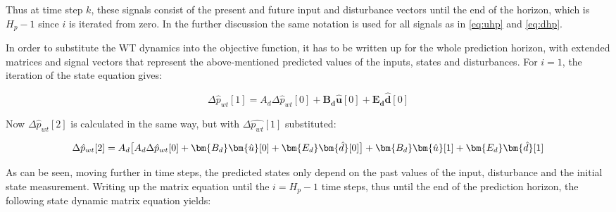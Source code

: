 Thus at time step $k$, these signals consist of the present and future input and disturbance vectors until the end of the horizon, which is $H_p - 1$ since $i$ is iterated from zero. In the further discussion the same notation is used for all signals as in \eqref{eq:uhp} and \eqref{eq:dhp}.

In order to substitute the WT dynamics into the objective function, it has to be written up for the whole prediction horizon, with extended matrices and signal vectors that represent the above-mentioned predicted values of the inputs, states and disturbances.
For $i = 1$, the iteration of the state equation gives:


\begin{equation}
	\Delta \hat p_{wt}[1] = A_d\Delta \hat p_{wt}[0] + \bm{B_d} \bm{\hat{u}}[0] + \bm{E_d} \bm{\hat{d}}[0]
\end{equation}

Now $\Delta \hat p_{wt}[2]$ is calculated in the same way, but with $\Delta \hat{p_{wt}}[1]$ substituted: 

\begin{equation}
	\Delta \hat p_{wt}[2] = A_d\big[A_d\Delta \hat p_{wt}[0] + \bm{B_d}  \bm{\hat{u}}[0] + \bm{E_d}  \bm{\hat{d}}[0]\big] + \bm{B_d} \bm{\hat{u}}[1] + \bm{E_d} \bm{\hat{d}}[1]\\ 
\end{equation}

As can be seen, moving further in time steps, the predicted states only depend on the past values of the input, disturbance and the initial state measurement. Writing up the matrix equation until the $i = H_p - 1$ time steps, thus until the end of the prediction horizon, the following state dynamic matrix equation yields:

